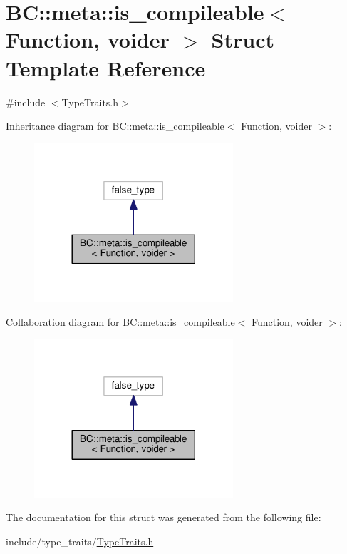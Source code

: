\hypertarget{structBC_1_1meta_1_1is__compileable}{}\section{BC\+:\+:meta\+:\+:is\+\_\+compileable$<$ Function, voider $>$ Struct Template Reference}
\label{structBC_1_1meta_1_1is__compileable}


{\ttfamily \#include $<$Type\+Traits.\+h$>$}



Inheritance diagram for BC\+:\+:meta\+:\+:is\+\_\+compileable$<$ Function, voider $>$\+:
\nopagebreak
\begin{figure}[H]
\begin{center}
\leavevmode
\includegraphics[width=209pt]{structBC_1_1meta_1_1is__compileable__inherit__graph}
\end{center}
\end{figure}


Collaboration diagram for BC\+:\+:meta\+:\+:is\+\_\+compileable$<$ Function, voider $>$\+:
\nopagebreak
\begin{figure}[H]
\begin{center}
\leavevmode
\includegraphics[width=209pt]{structBC_1_1meta_1_1is__compileable__coll__graph}
\end{center}
\end{figure}


The documentation for this struct was generated from the following file\+:\begin{DoxyCompactItemize}
\item 
include/type\+\_\+traits/\hyperlink{TypeTraits_8h}{Type\+Traits.\+h}\end{DoxyCompactItemize}
